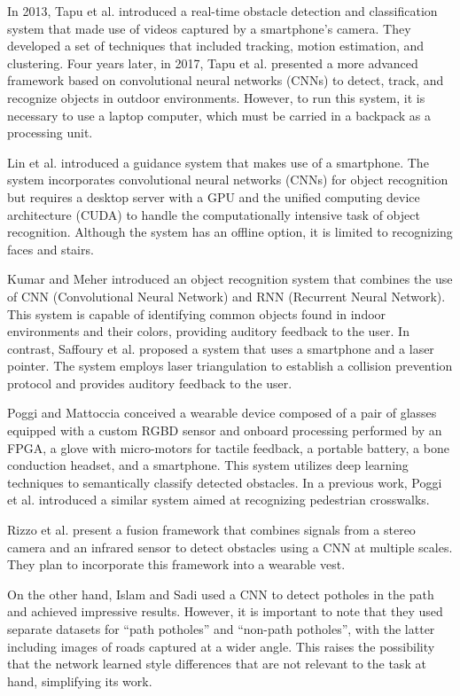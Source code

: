 \documentclass[preprint,12pt]{elsarticle}
\begin{document}
In 2013, Tapu et al. \cite{tapu2013} introduced a real-time obstacle detection and classification system that made use of videos captured by a smartphone's camera. They developed a set of techniques that included tracking, motion estimation, and clustering. Four years later, in 2017, Tapu et al. \cite{tapu2017} presented a more advanced framework based on convolutional neural networks (CNNs) to detect, track, and recognize objects in outdoor environments. However, to run this system, it is necessary to use a laptop computer, which must be carried in a backpack as a processing unit.

Lin et al. \cite{lin2017} introduced a guidance system that makes use of a smartphone. The system incorporates convolutional neural networks (CNNs) for object recognition but requires a desktop server with a GPU and the unified computing device architecture (CUDA) to handle the computationally intensive task of object recognition. Although the system has an offline option, it is limited to recognizing faces and stairs.

Kumar and Meher \cite{kumar2015} introduced an object recognition system that combines the use of CNN (Convolutional Neural Network) and RNN (Recurrent Neural Network). This system is capable of identifying common objects found in indoor environments and their colors, providing auditory feedback to the user. In contrast, Saffoury et al. \cite{saffoury2016} proposed a system that uses a smartphone and a laser pointer. The system employs laser triangulation to establish a collision prevention protocol and provides auditory feedback to the user.

Poggi and Mattoccia \cite{poggi2016} conceived a wearable device composed of a pair of glasses equipped with a custom RGBD sensor and onboard processing performed by an FPGA, a glove with micro-motors for tactile feedback, a portable battery, a bone conduction headset, and a smartphone. This system utilizes deep learning techniques to semantically classify detected obstacles. In a previous work, Poggi et al. \cite{poggi2015} introduced a similar system aimed at recognizing pedestrian crosswalks.

Rizzo et al. \cite{rizzo2017} present a fusion framework that combines signals from a stereo camera and an infrared sensor to detect obstacles using a CNN at multiple scales. They plan to incorporate this framework into a wearable vest.

On the other hand, Islam and Sadi \cite{islam2018} used a CNN to detect potholes in the path and achieved impressive results. However, it is important to note that they used separate datasets for ``path potholes'' and ``non-path potholes'', with the latter including images of roads captured at a wider angle. This raises the possibility that the network learned style differences that are not relevant to the task at hand, simplifying its work.
\end{document}
